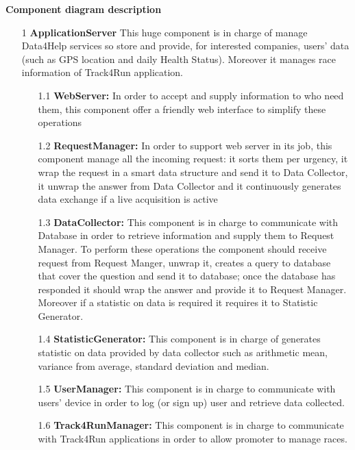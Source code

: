 {\large \textbf{Component diagram description}}
\begin{enumerate}
\item [1] \textbf{ApplicationServer} 
This huge component is in charge of manage Data4Help services so store and provide, for interested companies, users’ data (such as GPS location and daily Health Status). Moreover it manages race information of Track4Run application.

	\begin{enumerate}
	\item [1.1] \textbf{WebServer:} In order to accept and supply information to who need them, this component offer a friendly web interface to simplify these operations
		
	\item [1.2] \textbf{RequestManager:} In order to support web server in its job, this component manage all the incoming request: it sorts them per urgency, it wrap the request in a smart data structure and send it to Data Collector, it unwrap the answer from Data Collector and it continuously generates data exchange if a live acquisition is active
		
	\item [1.3] \textbf{DataCollector: } This component is in charge to communicate with Database in order to retrieve information and supply them to Request Manager. To perform these operations the component should receive request from Request Manger, unwrap it, creates a query to database that cover the question and send it to database; once the database has responded it should wrap the answer and provide it to Request Manager. Moreover if a statistic on data is required it requires it to Statistic Generator.
		
	\item [1.4] \textbf{StatisticGenerator: } This component is in charge of generates statistic on data provided by data collector such as arithmetic mean, variance from average, standard deviation and median.

	\item [1.5] \textbf{UserManager: } This component is in charge to communicate with users' device in order to log (or sign up) user and retrieve data collected.

	\item [1.6] \textbf{Track4RunManager: } This component is in charge to communicate with Track4Run applications in order to allow promoter to manage races.
	
	\end{enumerate}
	

\end{enumerate}
